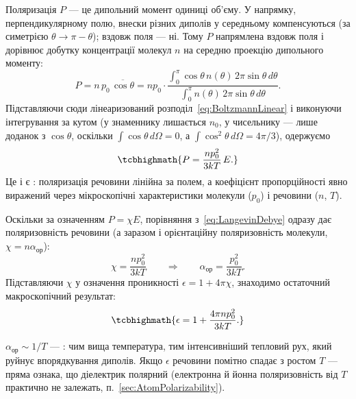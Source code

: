 Поляризація $P$ --- це дипольний момент одиниці об'єму. У напрямку, перпендикулярному полю, внески різних диполів у середньому компенсуються (за
симетрією $\theta\to\pi-\theta$); вздовж поля --- ні. Тому $P$ напрямлена вздовж поля і дорівнює добутку концентрації молекул $n$ на середню
проекцію дипольного моменту:
\begin{equation*}
	P = n\, p_0\, \overline{\cos\theta} = n p_0 \cdot \frac{\displaystyle\int_0^\pi \cos\theta \, n(\theta)\, 2\pi\sin\theta\, d\theta}
	{\displaystyle\int_0^\pi n(\theta)\, 2\pi\sin\theta\, d\theta}.
\end{equation*}
Підставляючи сюди лінеаризований розподіл~\eqref{eq:BoltzmannLinear} і виконуючи інтегрування за кутом (у знаменнику лишається $n_0$, у
чисельнику --- лише доданок з $\cos\theta$, оскільки $\int\cos\theta\,d\Omega=0$, а $\int\cos^2\theta\,d\Omega = 4\pi/3$), одержуємо
\begin{equation}\label{eq:LangevinDebye}
	\tcbhighmath{
		P = \frac{n p_0^2}{3kT}\, E.
	}
\end{equation}
Це і є : поляризація речовини лінійна за полем, а коефіцієнт пропорційності явно виражений через мікроскопічні
характеристики молекули ($p_0$) і речовини ($n$, $T$).

Оскільки за означенням $P = \chi E$, порівняння з~\eqref{eq:LangevinDebye} одразу дає поляризовність речовини (а заразом і орієнтаційну
поляризовність  молекули, $\chi = n\alpha_\text{ор}$):
\begin{equation*}
	\chi = \frac{n p_0^2}{3kT}
	\qquad\Longrightarrow\qquad
	\alpha_\text{ор} = \frac{p_0^2}{3kT}.
\end{equation*}
Підставляючи $\chi$ у означення проникності $\epsilon = 1+4\pi\chi$, знаходимо остаточний макроскопічний результат:
\begin{equation}\label{eq:CurieLaw}
	\tcbhighmath{
		\epsilon = 1 + \frac{4\pi n p_0^2}{3kT}.
	}
\end{equation}

\begin{Attention}
	$\alpha_\text{ор} \sim 1/T$ --- : чим вища температура, тим інтенсивніший тепловий рух, який руйнує впорядкування диполів.
	Якщо $\epsilon$ речовини помітно спадає з ростом $T$ --- пряма ознака, що діелектрик полярний (електронна й йонна поляризовність від $T$
	практично не залежать, п.~\ref{sec:AtomPolarizability}).
\end{Attention}

